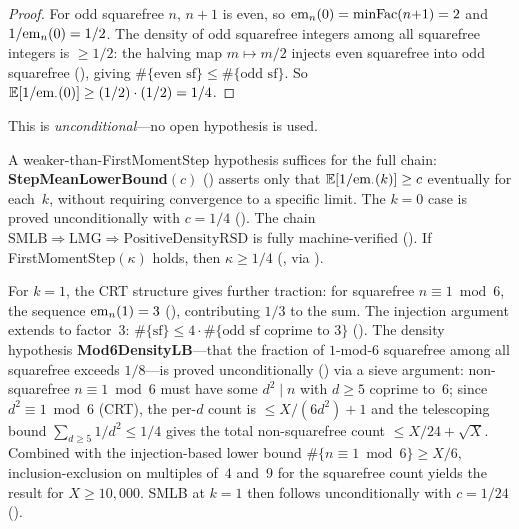 \begin{proof}
For odd squarefree $n$, $n{+}1$ is even, so
$\mathrm{em}_{n}(0) = \mathrm{minFac}(n{+}1) = 2$ and $1/\mathrm{em}_{n}(0) = 1/2$.
The density of odd squarefree integers among all squarefree
integers is $\geq 1/2$: the halving map $m \mapsto m/2$ injects
even squarefree into odd squarefree
(),
giving $\#\{\text{even sf}\} \leq \#\{\text{odd sf}\}$.
So $\mathbb{E}[1/\mathrm{em}_{\cdot}(0)] \geq (1/2) \cdot (1/2) = 1/4$.
\end{proof}

\noindent This is \emph{unconditional}---no open hypothesis is used.

A weaker-than-FirstMomentStep hypothesis suffices for the full chain:
\textbf{StepMeanLowerBound}$(c)$
()
asserts only that $\mathbb{E}[1/\mathrm{em}_{\cdot}(k)] \geq c$ eventually
for each~$k$, without requiring convergence to a specific limit.
The $k = 0$ case is proved unconditionally with $c = 1/4$
().
The chain $\mathrm{SMLB} \Rightarrow \mathrm{LMG} \Rightarrow
\mathrm{PositiveDensityRSD}$ is fully machine-verified
().
If FirstMomentStep$(\kappa)$ holds, then $\kappa \geq 1/4$
(,
via ).

For $k = 1$, the CRT structure gives further traction: for squarefree
$n \equiv 1 \bmod 6$, the sequence $\mathrm{em}_{n}(1) = 3$
(),
contributing $1/3$ to the sum.  The injection argument extends to
factor~3: $\#\{\text{sf}\} \leq 4 \cdot \#\{\text{odd sf coprime to 3}\}$
().
The density hypothesis \textbf{Mod6DensityLB}---that the fraction
of $1$-mod-$6$ squarefree among all squarefree exceeds $1/8$---is
proved unconditionally
()
via a sieve argument: non-squarefree $n \equiv 1 \bmod 6$ must have
some $d^2 \mid n$ with $d \geq 5$ coprime to~$6$; since
$d^2 \equiv 1 \bmod 6$ (CRT), the per-$d$ count is $\leq X/(6d^2)+1$
and the telescoping bound $\sum_{d \geq 5} 1/d^2 \leq 1/4$ gives
the total non-squarefree count $\leq X/24 + \sqrt{X}$.
Combined with the injection-based lower bound
$\#\{n \equiv 1 \bmod 6\} \geq X/6$, inclusion-exclusion on
multiples of~$4$ and~$9$ for the squarefree count yields the result
for $X \geq 10{,}000$.
SMLB at $k = 1$ then follows unconditionally with $c = 1/24$
().


